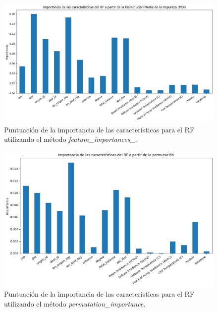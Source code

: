 \begin{figure}[H]
  \centering
  \includegraphics[width=\textwidth]{fig/06_fault_sg/fault_sg_09.png}
  \caption{Puntuación de la importancia de las características para el RF utilizando el método \textit{feature\_importances\_}.}
  \label{fig:fault_sg_09}
\end{figure}

\begin{figure}[H]
  \centering
  \includegraphics[width=\textwidth]{fig/06_fault_sg/fault_sg_10.png}
  \caption{Puntuación de la importancia de las características para el RF utilizando el método \textit{permutation\_importance}.}
  \label{fig:fault_sg_10}
\end{figure}

